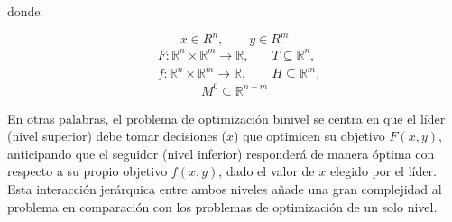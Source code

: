  \newpage
 \begin{samepage}
donde:

\begin{equation*}  
x \in R^{n}, \quad \quad y \in R^{m}
\end{equation*}
\begin{align*}
   & F : \mathbb{R}^{n} \times \mathbb{R}^{m} \to \mathbb{R}, 
   & \quad  T \subseteq \mathbb{R}^n ,
   \\
    & f : \mathbb{R}^{n} \times \mathbb{R}^{m} \to \mathbb{R} ,
    & \quad H \subseteq \mathbb{R}^m , 
\end{align*}
\begin{equation*}
    M^0 \subseteq \mathbb{R}^{n + m}
\end{equation*}
\end{samepage}
En otras palabras, el problema de optimización binivel se centra en que el líder (nivel superior) debe tomar decisiones ($x$) que optimicen su objetivo $F(x, y)$, anticipando que el seguidor (nivel inferior) responderá de manera óptima con respecto a su propio objetivo $f(x, y)$, dado el valor de $x$ elegido por el líder. Esta interacción jerárquica entre ambos niveles añade una gran complejidad al problema en comparación con los problemas de optimización de un solo nivel.

